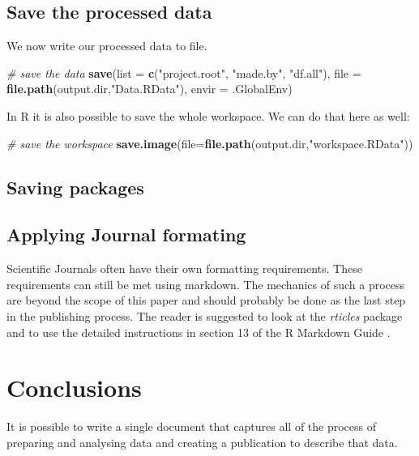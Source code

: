 \documentclass[11pt,]{article}
\newenvironment{Shaded}{\begin{snugshade}}{\end{snugshade}}
\newcommand{\CommentTok}[1]{\textcolor[rgb]{0.56,0.35,0.01}{\textit{#1}}}
\newcommand{\DataTypeTok}[1]{\textcolor[rgb]{0.13,0.29,0.53}{#1}}
\newcommand{\KeywordTok}[1]{\textcolor[rgb]{0.13,0.29,0.53}{\textbf{#1}}}
\newcommand{\NormalTok}[1]{#1}
\newcommand{\StringTok}[1]{\textcolor[rgb]{0.31,0.60,0.02}{#1}}
\begin{document}
\hypertarget{save-the-processed-data}{%
\subsection{Save the processed data}\label{save-the-processed-data}}

We now write our processed data to file.

\begin{Shaded}
\begin{Highlighting}[]
\CommentTok{# save the data}
\KeywordTok{save}\NormalTok{(}\DataTypeTok{list =} \KeywordTok{c}\NormalTok{(}\StringTok{"project.root"}\NormalTok{,}
              \StringTok{"made.by"}\NormalTok{,}
              \StringTok{"df.all"}\NormalTok{),}
       \DataTypeTok{file =} \KeywordTok{file.path}\NormalTok{(output.dir,}\StringTok{"Data.RData"}\NormalTok{),}
       \DataTypeTok{envir =}\NormalTok{ .GlobalEnv)}
\end{Highlighting}
\end{Shaded}

In R it is also possible to save the whole workspace. We can do that here as well:

\begin{Shaded}
\begin{Highlighting}[]
\CommentTok{# save the workspace}
\KeywordTok{save.image}\NormalTok{(}\DataTypeTok{file=}\KeywordTok{file.path}\NormalTok{(output.dir,}\StringTok{"workspace.RData"}\NormalTok{))}
\end{Highlighting}
\end{Shaded}

\hypertarget{saving-packages}{%
\subsection{Saving packages}\label{saving-packages}}

\hypertarget{applying-journal-formating}{%
\subsection{Applying Journal formating}\label{applying-journal-formating}}

Scientific Journals often have their own formatting requirements. These requirements can still be met using markdown. The mechanics of such a process are beyond the scope of this paper and should probably be done as the last step in the publishing process. The reader is suggested to look at the \emph{rticles} package and to use the detailed instructions in section 13 of the R Markdown Guide \citep{R-Markdown-Guide}.

\hypertarget{conclusions}{%
\section{Conclusions}\label{conclusions}}

It is possible to write a single document that captures all of the process of preparing and analysing data and creating a publication to describe that data.


\end{document}
